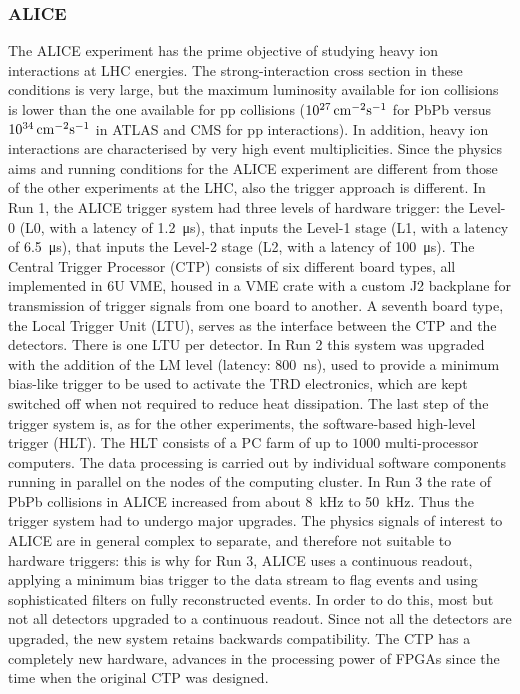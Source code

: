 \subsubsection{ALICE}
The ALICE experiment has the prime objective of studying heavy ion interactions at LHC energies. The strong-interaction cross section in these conditions is very large, but the maximum luminosity available for ion collisions is lower than the one available for pp collisions ($10^{27} \,\rm cm^{-2}s^{-1}$ for PbPb versus $10^{34} \,\rm cm^{-2}s^{-1}$ in ATLAS and CMS for pp interactions). In addition, heavy ion interactions are characterised by very high event multiplicities. Since the physics aims and running conditions for the ALICE experiment are different from those of the other experiments at the LHC, also the trigger approach is different. 
In Run 1, the ALICE trigger system had three levels of hardware trigger: the Level-0 (L0, with a latency of \SI{1.2}{\micro\second}), that inputs the Level-1 stage (L1, with a latency of \SI{6.5}{\micro\second}), that inputs the Level-2 stage (L2, with a latency of \SI{100}{\micro\second}).
The Central Trigger Processor (CTP) consists of six different board types, all implemented in 6U VME, housed in a VME crate with a custom J2 backplane for transmission of trigger signals from one board to another. A seventh board type, the Local Trigger Unit (LTU), serves as the interface between the CTP and the detectors. There is one LTU per detector.
In Run 2 this system was upgraded with the addition of the LM level (latency: \SI{800}{\nano\second}), used to provide a minimum bias-like trigger to be used to activate the TRD electronics, which are kept switched off when not required to reduce heat dissipation.
The last step of the trigger system is, as for the other experiments, the software-based high-level trigger (HLT). The HLT consists of a PC farm of up to $1000$ multi-processor computers. The data processing is carried out by individual software components running in parallel on the nodes of the computing cluster.
In Run 3 the rate of PbPb collisions in ALICE increased from about \SI{8}{\kilo\hertz} to \SI{50}{\kilo\hertz}. Thus the trigger system had to undergo major upgrades.
The physics signals of interest to ALICE are in general complex to separate, and therefore not suitable to hardware triggers: this is why for Run 3, ALICE uses a continuous readout, applying a minimum bias trigger to the data stream to flag events and using sophisticated filters on fully reconstructed events. In order to do this, most but not all detectors upgraded to a continuous readout. Since not all the detectors are upgraded, the new system retains backwards compatibility.
The CTP has a completely new hardware, advances in the processing power of FPGAs since the time when the original CTP was designed.

\newpage